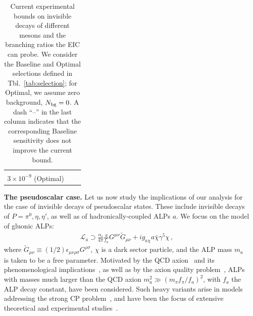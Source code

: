 \documentclass[aps,prd,preprintnumbers,superscriptaddress,nofootinbib,floatfix,twocolumn,notitlepage,reprint]{revtex4-2}
\begin{document}
\begin{table}[t!]
\begin{tabular}{|c|c|c|}
{$4\times10^{-8}$ (Baseline$_{\text{bg,free}}$)\\
$3\times10^{-9}$ (Optimal)
} \\
\hline
\end{tabular}
\caption{Current experimental bounds on invisible decays of different mesons and the branching ratios the EIC can probe. We consider the Baseline and Optimal selections defined in Tbl.~\ref{tab:selection}; for Optimal, we assume zero background, $N_{\rm bg}=0$. A dash ``--'' in the last column indicates that the corresponding Baseline sensitivity does not improve the current bound.}
\label{tab:mesons}
\end{table}


\textbf{The pseudoscalar case.} 
Let us now study the implications of our analysis for the case of invisible decays of pseudoscalar states. 
These include invisible decays of $P = \pi^{0},\eta,\eta'$, as well as of hadronically-coupled ALPs $a$. 
We focus on the model of gluonic ALPs:
%
\begin{align}
    \label{eq:Lagr_alp}
	\mathcal L_a 
    \supset 
    \frac{\alpha_s}{4\pi } \frac{ a }{f_a} G^{\mu\nu} \tilde{G}_{ \mu \nu} 
    + ig_{a\chi}a\bar \chi \gamma^{5}\chi \,,
\end{align}
%
where ${\tilde{G}_{\mu\nu} \equiv (1/2) \epsilon_{\mu\nu \rho \sigma} G^{\rho \sigma}}$, $\chi$ is a dark sector particle, and the ALP mass $m_a$ is taken to be a free parameter. 
Motivated by the QCD axion~\cite{Peccei:1977hh,Peccei:1977ur,Weinberg:1977ma,Wilczek:1977pj} and its phenomenological implications~\cite{Abbott:1982af,Dine:1982ah,Preskill:1982cy,Marsh:2015xka,Adams:2022pbo,Nomura:2008ru,Freytsis:2010ne,Dolan:2014ska,Hochberg:2018rjs,Fitzpatrick:2023xks,Wang:2024mrc}, as well as by the axion quality problem~\cite{Kamionkowski:1992mf,Holman:1992us,Barr:1992qq,Ghigna:1992iv}, ALPs with masses much larger than the QCD axion $m_a^2 \gg  (m_\pi f_\pi/ f_a)^2$, with $f_a$ the ALP decay constant, have been considered. 
Such heavy variants arise in models addressing the strong CP problem~\cite{Dimopoulos:1979pp,Holdom:1982ex,Flynn:1987rs,Rubakov:1997vp,Berezhiani:2000gh,Fukuda:2015ana,Gherghetta:2016fhp,Dimopoulos:2016lvn,Fukuda:2017ywn,Agrawal:2017ksf,Gaillard:2018xgk,Lillard:2018fdt,Hook:2019qoh,Csaki:2019vte,Gherghetta:2020keg,Valenti:2022tsc,Kivel:2022emq,Dunsky:2023ucb}, and have been the focus of extensive theoretical and experimental studies~\cite{Dolan:2017osp,Alves:2017avw,Marciano:2016yhf,Jaeckel:2015jla,Dobrich:2015jyk,Izaguirre:2016dfi,Knapen:2016moh,Bauer:2018uxu,Mariotti:2017vtv,CidVidal:2018blh,Aloni:2018vki,Aloni:2019ruo,Bauer:2020jbp,Bauer:2021wjo,Sakaki:2020mqb,Florez:2021zoo,Brdar:2020dpr,Bertholet:2021hjl,Co:2022bqq,Trifinopoulos:2022tfx,Ghebretinsaea:2022djg,DallaValleGarcia:2023xhh,Kyselov:2025uez,Afik:2023mhj,Balkin:2021jdr,Blinov:2021say,Balkin:2023gya,Bai:2021gbm,Pybus:2023yex,Bai:2024lpq,Gao:2024rgl,Davoudiasl:2024fiz,Baruch:2025lbw,Ovchynnikov:2025gpx}. 
\end{document}
